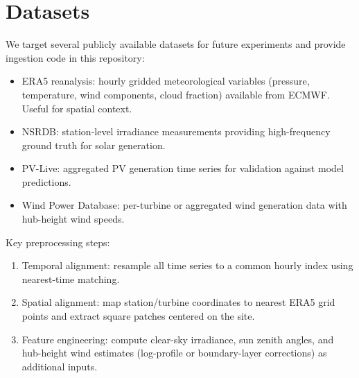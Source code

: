 \section*{Datasets}

We target several publicly available datasets for future experiments and provide ingestion code in this repository:
\begin{itemize}
	\item ERA5 reanalysis: hourly gridded meteorological variables (pressure, temperature, wind components, cloud fraction) available from ECMWF. Useful for spatial context.
	\item NSRDB: station-level irradiance measurements providing high-frequency ground truth for solar generation.
	\item PV-Live: aggregated PV generation time series for validation against model predictions.
	\item Wind Power Database: per-turbine or aggregated wind generation data with hub-height wind speeds.
\end{itemize}

Key preprocessing steps:
\begin{enumerate}
	\item Temporal alignment: resample all time series to a common hourly index using nearest-time matching.
	\item Spatial alignment: map station/turbine coordinates to nearest ERA5 grid points and extract square patches centered on the site.
	\item Feature engineering: compute clear-sky irradiance, sun zenith angles, and hub-height wind estimates (log-profile or boundary-layer corrections) as additional inputs.
\end{enumerate}

